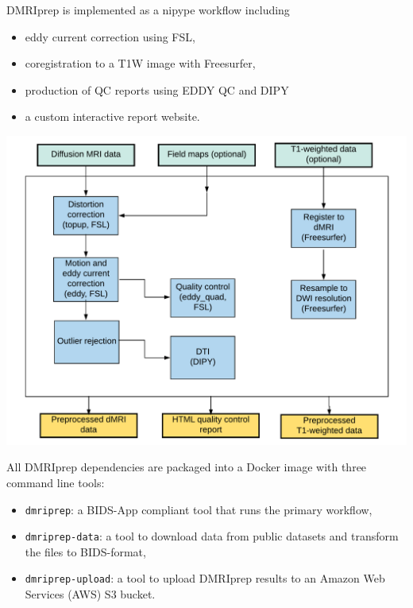 \documentclass[a0paper,portrait,fontscale=0.395]{baposter}
\newenvironment{Figure}
  {\par\medskip\noindent\minipage{\linewidth}}
  {\endminipage\par\medskip}
\begin{document}
\begin{poster}
{\noindent DMRIprep is implemented as a nipype\cite{gorgolewski2016brain} workflow including
\begin{itemize}[noitemsep, leftmargin=*]
    \item eddy current correction using FSL,
    \item coregistration to a T1W image with Freesurfer,
    \item production of QC reports using EDDY QC\cite{bastiani2019automated} and DIPY\cite{garyfallidis2014dipy}
    \item a custom interactive report website.
\end{itemize}
\vspace{-0.5em}
\begin{Figure}
    \centering
    \includegraphics[width=0.82\linewidth]{dmriprep_workflow.pdf}
\end{Figure}

\noindent All DMRIprep dependencies are packaged into a Docker image with three command line tools:
\begin{itemize}[noitemsep, leftmargin=*]
    \item \texttt{dmriprep}: a BIDS-App compliant tool that runs the primary workflow,
    \item \texttt{dmriprep-data}: a tool to download data from public datasets and transform the files to BIDS-format,
    \item \texttt{dmriprep-upload}: a tool to upload DMRIprep results to an Amazon Web Services (AWS) S3 bucket.
\end{itemize}
}


\end{poster}
\end{document}
